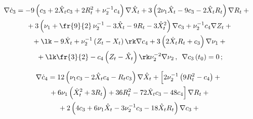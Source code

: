\noindent

\begin{multline*}

\!\!\!\!\nabla \dot c_3= - 9 \left(c_3 + 2 \hat X_t c_3 + 2 R_t^2+\nu_2^{-1} c_4\right) 

\nabla \hat X_t + 3 \left(2 \nu_1 \hat X_t - 9 c_3 - 2 \hat X_t R_t\right) \nabla R_t+{}\\

{}+3 \left(\nu_1 +\fr{9}{2}\, \nu_2^{-1} - 3 \hat X_t - 9 R_t - 

3 \hat X_t^2\right) 

\nabla c_3+\nu_2^{-1} c_4 \nabla Z_t+ {}\\

{}+\lk - 9 \hat X_t + \nu_2^{-1} 

\left(Z_t - X_t\right) \rk \nabla c_4 + 3 \left(2 \hat X_t R_t + c_3\right) 

\nabla \nu_1 + {}\\

{}+\lk \fr{3}{2}- 

  c_4 \left(Z_t - \hat X_t\right) \rk  \nu_2^{-2} \nabla \nu_2\,,\enskip 

  \nabla c_3 \left(t_0\right) =0\,; %

  \end{multline*}

  

  

\vspace*{-12pt}



\noindent

\begin{multline*}

\nabla \dot c_4 = 12 \left(\nu_1 c_3 - 2 \hat X_t c_4 - R_t c_3\right) 

\nabla \hat X_t + \left[\vphantom{\left(\hat X_t^2 + 3 R_t\right)}

2 \nu_2^{-1} \left(9 R_t^2 - c_4\right) +{}\right.\\

\left.{}+6 \nu_1 \left(\hat X_t^2 + 3 R_t\right) + 36 R_t^2 - 72 \hat X_t c_3 - 

48 c_4\right] \nabla R_t+{}\\

{}+ 2 \left( 4 c_3 + 6 \nu_1 \hat X_t - 3 \nu_2^{-1} c_3 - 18 \hat X_t R_t

\right) 

\nabla c_3 + {}

\end{multline*}



